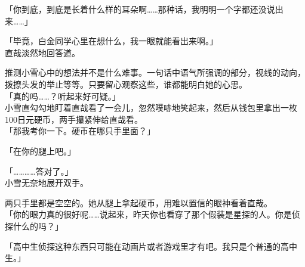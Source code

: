 「你到底，到底是长着什么样的耳朵啊……那种话，我明明一个字都还没说出来……」

「毕竟，白金同学心里在想什么，我一眼就能看出来啊。」\\

直哉淡然地回答道。

推测小雪心中的想法并不是什么难事。一句话中语气所强调的部分，视线的动向，拨撩头发的举止等等。只要留心观察这些，谁都能明白她的心思。\\

「真的吗……？听起来好可疑。」\\

小雪直勾勾地盯着直哉看了一会儿，忽然噗哧地笑起来，然后从钱包里拿出一枚100日元硬币，两手攥紧伸给直哉看。\\

「那我考你一下。硬币在哪只手里面？」

「在你的腿上吧。」

「…………答对了。」\\

小雪无奈地展开双手。

两只手里都是空空的。她从腿上拿起硬币，用难以置信的眼神看着直哉。\\

「你的眼力真的很好呢……说起来，昨天你也看穿了那个假装是星探的人。你是侦探什么的吗？」

「高中生侦探这种东西只可能在动画片或者游戏里才有吧。我只是个普通的高中生。」

